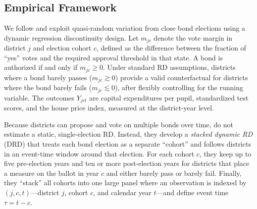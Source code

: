 
\subsection{Empirical Framework}

We follow \citet{biasi_what_2025} and exploit quasi-random variation from close bond elections using a dynamic regression discontinuity design. Let $m_{jc}$ denote the vote margin in district $j$ and election cohort $c$, defined as the difference between the fraction of “yes” votes and the required approval threshold in that state. A bond is authorized if and only if $m_{jc} \ge 0$. Under standard RD assumptions, districts where a bond barely passes ($m_{jc} \gtrsim 0$) provide a valid counterfactual for districts where the bond barely fails ($m_{jc} \lesssim 0$), after flexibly controlling for the running variable. The outcomes $Y_{jct}$ are capital expenditures per pupil, standardized test scores, and the house price index, measured at the district-year level.

Because districts can propose and vote on multiple bonds over time, \citet{biasi_what_2025} do not estimate a static, single-election RD. Instead, they develop a \emph{stacked dynamic RD} (DRD) that treats each bond election as a separate “cohort” and follows districts in an event-time window around that election. For each cohort $c$, they keep up to five pre-election years and ten or more post-election years for districts that place a measure on the ballot in year $c$ and either barely pass or barely fail. Finally, they ``stack'' all cohorts into one large panel where an observation is indexed by $(j,c,t)$—district $j$, cohort $c$, and calendar year $t$—and define event time $\tau = t - c$.


